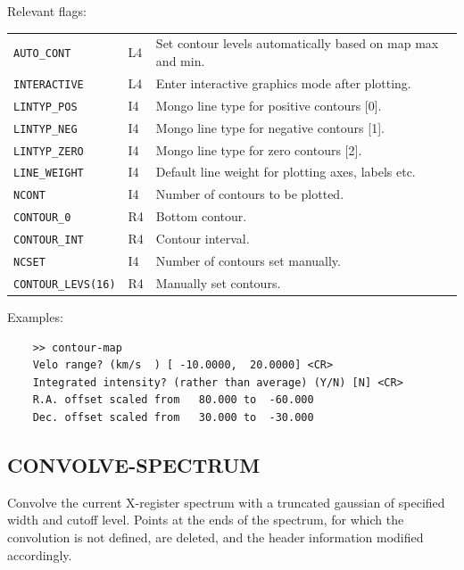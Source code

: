 \documentclass[11pt,twoside]{report}
\begin{document}
Relevant flags:\\
\begin{tabular}{lll}
 \verb+AUTO_CONT+    & L4 & \parbox[t]{4in}{Set contour levels automatically based on map max
                            and min.}\\
 \verb+INTERACTIVE+  & L4 & Enter interactive graphics mode after plotting.\\
 \verb+LINTYP_POS+   & I4 & Mongo line type for positive contours [0].\\
 \verb+LINTYP_NEG+   & I4 & Mongo line type for negative contours [1].\\
 \verb+LINTYP_ZERO+  & I4 & Mongo line type for zero contours [2].\\
 \verb+LINE_WEIGHT+  & I4 & Default line weight for plotting axes,
                            labels etc.\\
 \verb+NCONT+        & I4 & Number of contours to be plotted.\\
 \verb+CONTOUR_0+    & R4 & Bottom contour.\\
 \verb+CONTOUR_INT+  & R4 & Contour interval.\\
 \verb+NCSET+        & I4 & Number of contours set manually.\\
 \verb+CONTOUR_LEVS(16)+ & R4 & Manually set contours.
\end{tabular}

Examples:
\begin{verbatim}
    >> contour-map
    Velo range? (km/s  ) [ -10.0000,  20.0000] <CR>
    Integrated intensity? (rather than average) (Y/N) [N] <CR>
    R.A. offset scaled from   80.000 to  -60.000
    Dec. offset scaled from   30.000 to  -30.000
\end{verbatim}

\subsection{CONVOLVE-SPECTRUM} 

Convolve the current X-register spectrum with a truncated gaussian of
specified width and cutoff level. Points at the ends of the spectrum,
for which the convolution is not defined, are deleted, and the 
header information modified accordingly.
\end{document}
